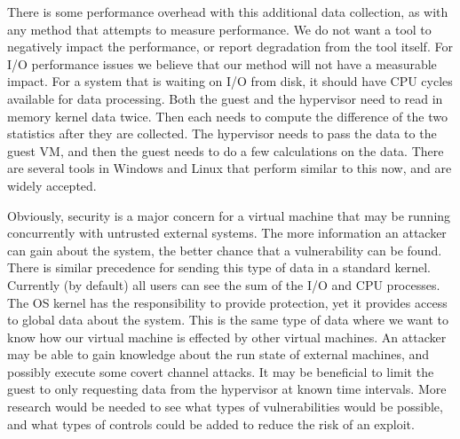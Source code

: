 There is some performance overhead with this additional data collection, as with any method that attempts to measure performance.  We do not want a tool to negatively impact the performance, or report degradation from the tool itself.  For I/O performance issues we believe that our method will not have a measurable impact.  For a system that is waiting on I/O from disk, it should have CPU cycles available for data processing.  Both the guest and the hypervisor need to read in memory kernel data twice.  Then each needs to compute the difference of the two statistics after they are collected.  The hypervisor needs to pass the data to the guest VM, and then the guest needs to do a few calculations on the data.  There are several tools in Windows and Linux that perform similar to this now, and are widely accepted.

Obviously, security is a major concern for a virtual machine that may be running concurrently with untrusted external systems.  The more information an attacker can gain about the system, the better chance that a vulnerability can be found.  There is similar precedence for sending this type of data in a standard kernel.  Currently (by default) all users can see the sum of the I/O and CPU processes.  The OS kernel has the responsibility to provide protection, yet it provides access to global data about the system.  This is the same type of data where we want to know how our virtual machine is effected by other virtual machines.  An attacker may be able to gain knowledge about the run state of external machines, and possibly execute some covert channel attacks.  It may be beneficial to limit the guest to only requesting data from the hypervisor at known time intervals.  More research would be needed to see what types of vulnerabilities would be possible, and what types of controls could be added to reduce the risk of an exploit.  


